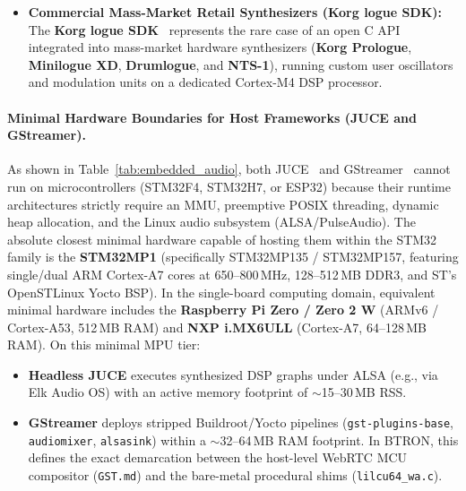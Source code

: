 \documentclass[10pt,journal,compsoc,twocolumn]{article}
\begin{document}
\begin{itemize}[leftmargin=*]
    commercial engine for digital Eurorack hardware manufactured by
    \textbf{Noise Engineering} (the \emph{Versio} and \emph{Legio} DSP platforms)
    and \textbf{Qu-Bit Electronix} (\emph{Aurora}, \emph{Nautilus}, \emph{Surface}).
    In boutique hardware pedals, \textbf{Cycling '74 RNBO}~\cite{rnbo2022} enables sound
    designers to export Max/MSP visual patches directly into standalone C++ code
    executing on devices like the \textbf{Empress Effects ZOIA} and \textbf{Poly
    Effects Beebo}. In parallel, \textbf{FAUST}~\cite{orlarey2004faust} (GRAME/CCRMA)
    is widely employed by physical modeling synthesizers (e.g., Moog Music software
    instruments) to compile functional mathematical formulations into SIMD-accelerated C++.
    \item \textbf{Commercial Mass-Market Retail Synthesizers (Korg logue SDK):}
    The \textbf{Korg logue SDK}~\cite{korg_sdk2019} represents the rare case of an open
    C API integrated into mass-market hardware synthesizers (\textbf{Korg Prologue},
    \textbf{Minilogue XD}, \textbf{Drumlogue}, and \textbf{NTS-1}), running custom user
    oscillators and modulation units on a dedicated Cortex-M4 DSP processor.
\end{itemize}

\paragraph{Minimal Hardware Boundaries for Host Frameworks (JUCE and GStreamer).}
As shown in Table~\ref{tab:embedded_audio}, both JUCE~\cite{juce2004} and
GStreamer~\cite{gst_mcu} cannot run on microcontrollers (STM32F4, STM32H7,
or ESP32) because their runtime architectures strictly require an MMU,
preemptive POSIX threading, dynamic heap allocation, and the Linux audio
subsystem (ALSA/PulseAudio). The absolute closest minimal hardware capable
of hosting them within the STM32 family is the \textbf{STM32MP1}
(specifically STM32MP135 / STM32MP157, featuring single/dual ARM Cortex-A7
cores at 650--800\,MHz, 128--512\,MB DDR3, and ST's OpenSTLinux Yocto BSP).
In the single-board computing domain, equivalent minimal hardware includes
the \textbf{Raspberry Pi Zero / Zero 2 W} (ARMv6 / Cortex-A53, 512\,MB RAM)
and \textbf{NXP i.MX6ULL} (Cortex-A7, 64--128\,MB RAM). On this minimal MPU
tier:
\begin{itemize}[leftmargin=*]
    \item \textbf{Headless JUCE} executes synthesized DSP graphs under ALSA
    (e.g., via Elk Audio OS) with an active memory footprint of $\sim$15--30\,MB RSS.
    \item \textbf{GStreamer} deploys stripped Buildroot/Yocto pipelines
    (\texttt{gst-plugins-base}, \texttt{audiomixer}, \texttt{alsasink}) within
    a $\sim$32--64\,MB RAM footprint. In BTRON, this defines the exact
    demarcation between the host-level WebRTC MCU compositor (\texttt{GST.md})
    and the bare-metal procedural shims (\texttt{lilcu64\_wa.c}).
\end{itemize}
\end{document}
